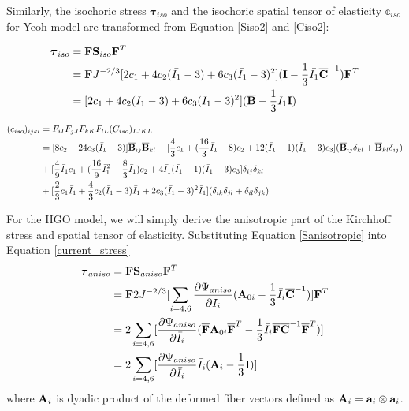 Similarly, the isochoric stress $\boldsymbol{\tau}_{iso}$ and the isochoric spatial tensor of elasticity $\mathbb{c}_{iso}$ for Yeoh model are transformed from Equation \ref{Siso2} and \ref{Ciso2}:

\begin{equation} \label{Tauiso2}
\begin{split}
\boldsymbol{\tau}_{iso} 
&= \bold{F}\bold{S}_{iso}{\bold{F}}^T \\
&= \bold{F}  J^{-2/3}[2c_1 + 4c_2(\bar{I_1} - 3) + 6c_3(\bar{I_1} - 3)^2] (\bold{I} - \frac{1}{3}\bar{I_1}{\overline{\bold{C}}}^{-1})  \bold{F}^T \\
&= [2c_1 + 4c_2(\bar{I_1} - 3) + 6c_3(\bar{I_1} - 3)^2](\overline{\bold{B}} - \frac{1}{3}\bar{I}_1\bold{I})
\end{split}
\end{equation}

\begin{equation} \label{spatial_ciso2}
\begin{split}
(c_{iso})_{ijkl} &=  F_{iI}F_{jJ}F_{kK}F_{lL}(C_{iso})_{IJKL} \\
&= 
[8c_2+24c_3({\bar{I}}_1 - 3)] {\overline{\bold{B}}}_{ij}{\overline{\bold{B}}}_{kl} 
- [\frac{4}{3}c_1 + (\frac{16}{3}{\bar{I}}_1 - 8)c_2 + 12({\bar{I}}_1 - 1)({\bar{I}}_1 - 3)c_3]({\overline{\bold{B}}}_{ij}\delta_{kl} + {\overline{\bold{B}}}_{kl}\delta_{ij}) \\
&+ [\frac{4}{9}{\bar{I}}_1c_1 + (\frac{16}{9}{{\bar{I}}_1}^2 - \frac{8}{3}{\bar{I}}_1)c_2 + 4{\bar{I}}_1({\bar{I}}_1 - 1)({\bar{I}}_1 - 3)c_3] \delta_{ij}\delta_{kl} \\
&+ [\frac{2}{3}c_1{\bar{I}}_1 + \frac{4}{3}c_2({\bar{I}}_1 - 3){\bar{I}}_1 + 2c_3({\bar{I}}_1 - 3)^2{\bar{I}}_1](\delta_{ik}\delta_{jl} + \delta_{il}\delta_{jk})
\end{split}
\end{equation} 

For the HGO model, we will simply derive the anisotropic part of the Kirchhoff stress and spatial tensor of elasticity. Substituting Equation \ref{Sanisotropic} into Equation \ref{current_stress}
\begin{equation} \label{Tauiso3}
\begin{split}
\boldsymbol{\tau}_{aniso} 
&= \bold{F}\bold{S}_{aniso}{\bold{F}}^T \\
&= \bold{F} 2J^{-2/3} [\sum_{i = 4, 6}\frac{\partial{\Psi_{aniso}}}{\partial{\bar{I}_i}}  (\bold{A}_{0i} - \frac{1}{3}\bar{I}_i\overline{\bold{C}}^{-1})] {\bold{F}}^T \\
&= 2\sum_{i = 4, 6}[\frac{\partial{\Psi_{aniso}}}{\partial{\bar{I}_i}} ({\overline{\bold{F}}}\bold{A}_{0i}{\overline{\bold{F}}}^T - \frac{1}{3}\bar{I}_i{\overline{\bold{F}}}\overline{\bold{C}}^{-1}{\overline{\bold{F}}}^T)] \\
&= 2\sum_{i = 4, 6}[\frac{\partial{\Psi_{aniso}}}{\partial{\bar{I}_i}}\bar{I}_i (\bold{A}_{i} - \frac{1}{3}\bold{I})]
\end{split}
\end{equation}
where $\bold{A}_i$ is dyadic product of the deformed fiber vectors defined as $\bold{A}_i = \bold{a}_i \otimes \bold{a}_i$. 


